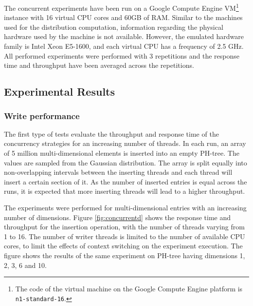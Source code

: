 \documentclass[11pt,a4paper]{globis-book}
\begin{document}
The concurrent experiments have been run on a Google Compute Engine VM\footnote{The code of the virtual machine on the Google Compute Engine platform is \texttt{n1-standard-16}.} instance with 16 virtual CPU cores and 60GB of RAM. Similar to the machines used for the distribution computation, information regarding the physical hardware used by the machine is not available. However, the emulated hardware family is Intel Xeon E5-1600, and each virtual CPU has a frequency of 2.5 GHz. All performed experiments were performed with 3 repetitions and the response time and throughput have been averaged across the repetitions. 

\subsection{Experimental Results}
\subsubsection{Write performance}

The first type of tests evaluate the throughput and response time of the concurrency strategies for an increasing number of threads. In each run, an array of 5 million multi-dimensional elements is inserted into an empty PH-tree. The values are sampled from the Gaussian distribution. The array is split equally into non-overlapping intervals between the inserting threads and each thread will insert a certain section of it. As the number of inserted entries is equal across the runs, it is expected that more inserting threads will lead to a higher throughput.

The experiments were performed for multi-dimensional entries with an increasing number of dimensions. Figure \ref{fig:concurrentd} shows the response time and throughput for the insertion operation, with the number of threads varying from 1 to 16. The number of writer threads is limited to the number of available CPU cores, to limit the effects of context switching on the experiment execution. The figure shows the results of the same experiment on PH-tree having dimensions 1, 2, 3, 6 and 10.  
\end{document}
